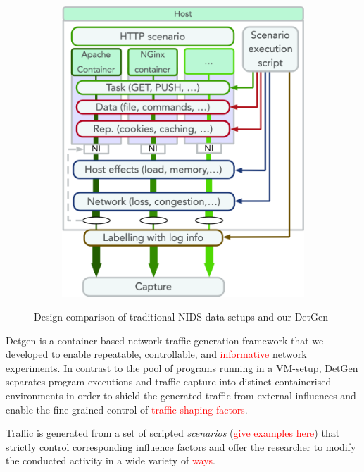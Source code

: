 \documentclass[sigconf]{acmart}
\begin{document}
\begin{figure}
\begin{subfigure}[b]{0.4\textwidth}
\includegraphics[width=\textwidth]{images/Docker_setup_final.png}
\end{subfigure}
\caption{Design comparison of traditional NIDS-data-setups and our DetGen }
\end{figure}

Detgen is a container-based network traffic generation framework that we developed to enable repeatable, controllable, and \textcolor{red}{informative} network experiments. In contrast to the pool of programs running in a VM-setup, DetGen separates program executions and traffic capture into distinct containerised environments in order to shield the generated traffic from external influences and enable the fine-grained control of \textcolor{red}{traffic shaping factors}.

Traffic is generated from a set of scripted \textit{scenarios} (\textcolor{red}{give examples here}) that strictly control corresponding influence factors and offer the researcher to modify the conducted activity in a wide variety of \textcolor{red}{ways}.

\end{document}
